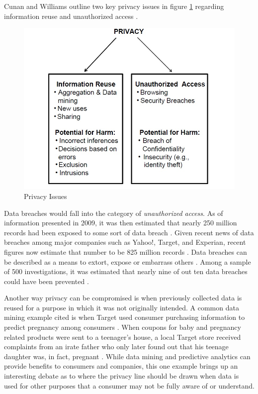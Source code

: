 \documentclass[sigconf]{acmart}
\begin{document}
Cunan and Williams outline two key privacy issues in figure \ref{f:Privacy Issues} regarding information reuse and unauthorized access \cite{Culnan2009}. 

\begin{figure}[!htb]
  \centering\includegraphics[width=\columnwidth]{images/privacy.jpg}
  \caption{Privacy Issues}\label{f:Privacy Issues}
\end{figure}

Data breaches would fall into the category of \textit{unauthorized access}. As of information presented in 2009, it was then estimated that nearly 250 million records had been exposed to some sort of data breach \cite{Cavoukian2012}. Given recent news of data breaches among major companies such as Yahoo!, Target, and Experian, recent figures now estimate that number to be 825 million records \cite{Shell2017}. Data breaches can be described as a means to extort, expose or embarrass others \cite{Agelidis2016}. Among a sample of 500 investigations, it was estimated that nearly nine of out ten data breaches could have been prevented \cite{Culnan2009}. 

Another way privacy can be compromised is when previously collected data is reused for a purpose in which it was not originally intended. A common data mining example cited is when Target used consumer purchasing information to predict pregnancy among consumers \cite{Xu2014}. When coupons for baby and pregnancy related products were sent to a teenager's house, a local Target store received complaints from an irate father who only later found out that his teenage daughter was, in fact, pregnant \cite{Xu2014}. While data mining and predictive analytics can provide benefits to consumers and companies, this one example brings up an interesting debate as to where the privacy line should be drawn when data is used for other purposes that a consumer may not be fully aware of or understand.
\end{document}
